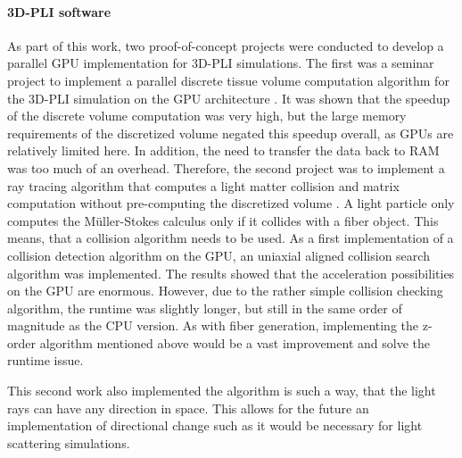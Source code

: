 \paragraph{\ac{3D-PLI} software}
As part of this work, two proof-of-concept projects were conducted to develop a parallel GPU implementation for \ac{3D-PLI} simulations.
The first was a seminar project to implement a parallel discrete tissue volume computation algorithm for the \ac{3D-PLI} simulation on the \ac{GPU} architecture \cite{Kobusch:Seminar}.
It was shown that the speedup of the discrete volume computation was very high, but the large memory requirements of the discretized volume negated this speedup overall, as \acp{GPU} are relatively limited here.
In addition, the need to transfer the data back to \ac{RAM} was too much of an overhead.
Therefore, the second project was to implement a ray tracing algorithm that computes a light matter collision and matrix computation without pre-computing the discretized volume \cite{Kobusch:887783, GPUfastpli}.
A light particle only computes the M{\"u}ller-Stokes calculus only if it collides with a fiber object.
This means, that a collision algorithm needs to be used.
As a first implementation of a collision detection algorithm on the \ac{GPU}, an uniaxial aligned collision search algorithm \cite{Karras2012} was implemented.
The results showed that the acceleration possibilities on the \ac{GPU} are enormous.
However, due to the rather simple collision checking algorithm, the runtime was slightly longer, but still in the same order of magnitude as the \ac{CPU} version.
As with fiber generation, implementing the z-order algorithm mentioned above \cite{Karras2012} would be a vast improvement and solve the runtime issue.
\par
%
This second work also implemented the algorithm is such a way, that the light rays can have any direction in space.
This allows for the future an implementation of directional change such as it would be necessary for light scattering simulations.
%
%
%
